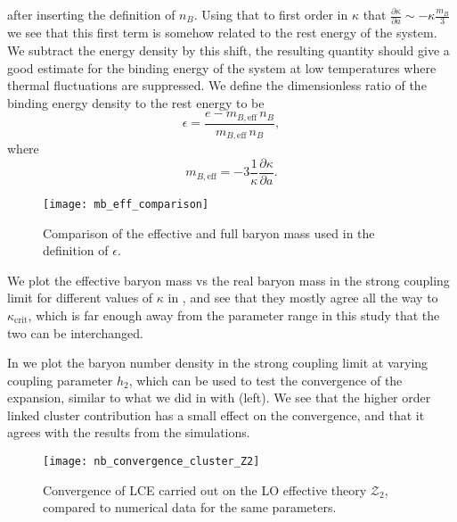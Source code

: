 %
after inserting the definition of $n_B$. Using that to first order in $\kappa$
that $\frac{\partial \kappa}{\partial a} \sim \minus{}\kappa \frac{m_B}{3}$ we see that
this first term is somehow related to the rest energy of the system. We subtract
the energy density by this shift, the resulting quantity should give a good estimate for the
binding energy of the system at low temperatures where thermal fluctuations are
suppressed. We define the dimensionless ratio of the binding energy density to
the rest energy to be
%
\begin{equation} \label{eq:epsilon_definition}
  \epsilon = \frac{e - m_{B,\text{eff}}\, n_B}{m_{B,\text{eff}}\, n_B},
\end{equation}
%
where
%
\begin{equation}
  m_{B,\text{eff}} = -3 \frac{1}{\kappa} \frac{\partial \kappa}{\partial a}.
\end{equation}
%
\begin{figure}[t]%
  {\centering%
    \texttt{[image: mb\_eff\_comparison]}\par}
  \caption{Comparison of the effective and full baryon mass used in the definition of $\epsilon$.}%
  \label{fig:mb_eff_comparison}%
\end{figure}%
%
We plot the effective baryon mass vs the real baryon mass in the strong coupling
limit for different values of $\kappa$ in , and
see that they mostly agree all the way to $\kappa_{\mathrm{crit}}$, which is far
enough away from the parameter range in this study that the two can be
interchanged.

In  we plot the baryon number density in the
strong coupling limit at varying coupling parameter $h_2$, which can be used to
test the convergence of the expansion, similar to what we did in 
with  (left). We see that the higher order
linked cluster contribution has a small effect on the convergence, and that it
agrees with the results from the simulations.

\begin{figure}
  \begin{center}
    \texttt{[image: nb\_convergence\_cluster\_Z2]}
  \end{center}
  \caption{Convergence of LCE carried out on the LO effective theory
    $\mathcal{Z}_2$, compared to numerical data for the same parameters.}
  \label{fig:convergence_cluster_Z2}
\end{figure}

